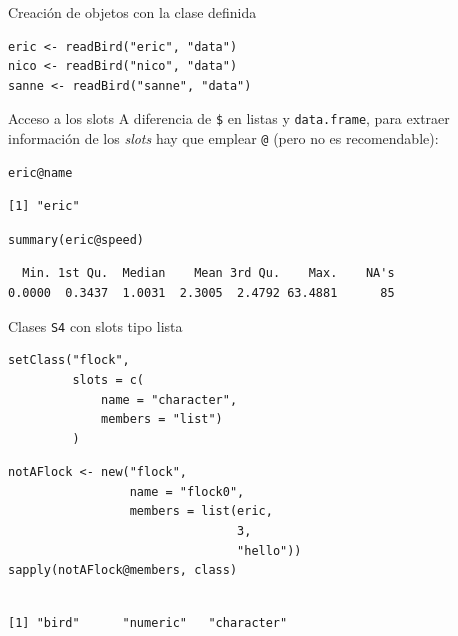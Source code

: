 \documentclass[xcolor={usenames,svgnames,dvipsnames}]{beamer}
\begin{document}
\begin{frame}[label={sec:org0931498},fragile]{Creación de objetos con la clase definida}
 \lstset{language=r,label= ,caption= ,captionpos=b,numbers=none}
\begin{lstlisting}
eric <- readBird("eric", "data")
nico <- readBird("nico", "data")
sanne <- readBird("sanne", "data")
\end{lstlisting}
\end{frame}


\begin{frame}[label={sec:org372c600},fragile]{Acceso a los slots}
 A diferencia de \texttt{\$} en listas y \texttt{data.frame}, para extraer información de los \emph{slots} hay que emplear \texttt{@} (pero no es recomendable):
\lstset{language=r,label= ,caption= ,captionpos=b,numbers=none}
\begin{lstlisting}
eric@name
\end{lstlisting}

\begin{verbatim}
[1] "eric"
\end{verbatim}


\lstset{language=r,label= ,caption= ,captionpos=b,numbers=none}
\begin{lstlisting}
summary(eric@speed)
\end{lstlisting}

\begin{verbatim}
  Min. 1st Qu.  Median    Mean 3rd Qu.    Max.    NA's 
0.0000  0.3437  1.0031  2.3005  2.4792 63.4881      85
\end{verbatim}
\end{frame}

\begin{frame}[label={sec:org5de531e},fragile]{Clases \texttt{S4} con slots tipo lista}
 \lstset{language=r,label= ,caption= ,captionpos=b,numbers=none}
\begin{lstlisting}
setClass("flock",
         slots = c(
             name = "character",
             members = "list")
         )

\end{lstlisting}

\lstset{language=r,label= ,caption= ,captionpos=b,numbers=none}
\begin{lstlisting}
notAFlock <- new("flock",
                 name = "flock0",
                 members = list(eric,
                                3,
                                "hello"))
sapply(notAFlock@members, class)
\end{lstlisting}

\begin{verbatim}

[1] "bird"      "numeric"   "character"
\end{verbatim}
\end{frame}
\end{document}
